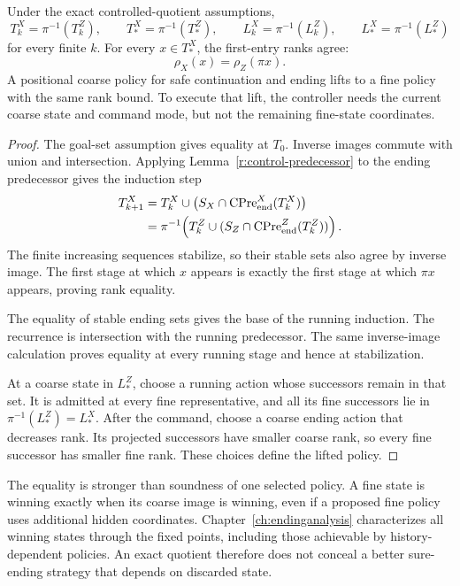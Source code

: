 \begin{theorem}\label{r:control-transport}
Under the exact controlled-quotient assumptions,
\[
 T^X_k=\pi^{-1}(T^Z_k),\qquad
 T^X_*=\pi^{-1}(T^Z_*),\qquad
 L^X_k=\pi^{-1}(L^Z_k),\qquad
 L^X_*=\pi^{-1}(L^Z_*)
\]
for every finite $k$. For every $x\in T^X_*$, the first-entry ranks agree:
\[
 \rho_X(x)=\rho_Z(\pi x).
\]
A positional coarse policy for safe continuation and ending lifts to a fine policy with the same rank bound. To execute that lift, the controller needs the current coarse state and command mode, but not the remaining fine-state coordinates.
\end{theorem}
\begin{proof}
The goal-set assumption gives equality at $T_0$. Inverse images commute with union and intersection. Applying Lemma~\ref{r:control-predecessor} to the ending predecessor gives the induction step
\begin{align*}
 T^X_{k+1}
 &=T^X_k\cup\bigl(S_X\cap\operatorname{CPre}^X_{\rm end}(T^X_k)\bigr)\\
 &=\pi^{-1}\!\left(T^Z_k\cup
       (S_Z\cap\operatorname{CPre}^Z_{\rm end}(T^Z_k))\right).
\end{align*}
The finite increasing sequences stabilize, so their stable sets also agree by inverse image. The first stage at which $x$ appears is exactly the first stage at which $\pi x$ appears, proving rank equality.

The equality of stable ending sets gives the base of the running induction. The recurrence is intersection with the running predecessor. The same inverse-image calculation proves equality at every running stage and hence at stabilization.

At a coarse state in $L^Z_*$, choose a running action whose successors remain in that set. It is admitted at every fine representative, and all its fine successors lie in $\pi^{-1}(L^Z_*)=L^X_*$. After the command, choose a coarse ending action that decreases rank. Its projected successors have smaller coarse rank, so every fine successor has smaller fine rank. These choices define the lifted policy.
\end{proof}

The equality is stronger than soundness of one selected policy. A fine state is winning exactly when its coarse image is winning, even if a proposed fine policy uses additional hidden coordinates. Chapter~\ref{ch:endinganalysis} characterizes all winning states through the fixed points, including those achievable by history-dependent policies. An exact quotient therefore does not conceal a better sure-ending strategy that depends on discarded state.

